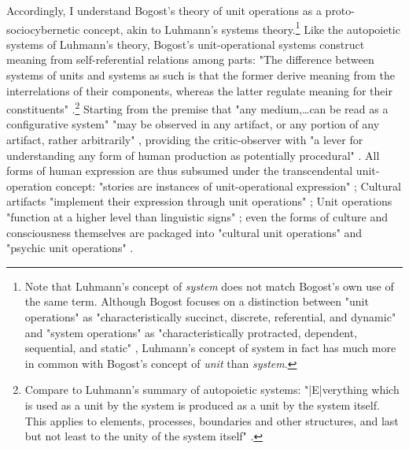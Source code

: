 Accordingly, I understand Bogost's theory of unit operations as a proto-sociocybernetic concept, akin to Luhmann's systems theory.\footnote{
  Note that Luhmann's concept of \emph{system} does not match Bogost's own use of the same term. Although Bogost focuses on a distinction between "unit operations" as "characteristically succinct, discrete, referential, and dynamic" and "system operations" as "characteristically protracted, dependent, sequential, and static" \autocite[4]{Bogost2006-ec}, Luhmann's concept of system in fact has much more in common with Bogost's concept of \emph{unit} than \emph{system}.}
Like the autopoietic systems of Luhmann's theory, Bogost's unit-operational systems construct meaning from self-referential relations among parts: "The difference between systems of units and systems as such is that the former derive meaning from the interrelations of their components, whereas the latter regulate meaning for their constituents" \autocite[4]{Bogost2006-ec}.\footnote{
  Compare to Luhmann's summary of autopoietic systems: "|E|verything which is used as a unit by the system is produced as a unit by the system itself. This applies to elements, processes, boundaries and other structures, and last but not least to the unity of the system itself" \autocite*[174]{Luhmann1986-kl}.
  }
Starting from the premise that "any medium,…can be read as a configurative system" \autocite[ix]{Bogost2006-ec} "may be observed in any artifact, or any portion of any artifact, rather arbitrarily" \autocite[14]{Bogost2006-ec}, providing the critic-observer with "a lever for understanding any form of human production as potentially procedural" \autocite[15]{Bogost2006-ec}. All forms of human expression are thus subsumed under the transcendental unit-operation concept: "stories are instances of unit-operational expression" \autocite[69]{Bogost2006-ec}; Cultural artifacts "implement their expression through unit operations" \autocite[73]{Bogost2006-ec}; Unit operations "function at a higher level than linguistic signs" \autocite[105]{Bogost2006-ec}; even the forms of culture and consciousness themselves are packaged into "cultural unit operations" \autocite[45]{Bogost2006-ec} and "psychic unit operations" \autocite[150]{Bogost2006-ec}.

